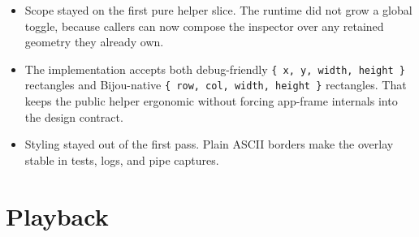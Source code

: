 \begin{itemize}
\tightlist
\item
  Scope stayed on the first pure helper slice. The runtime did not grow a global toggle, because callers can now compose the inspector over any retained geometry they already own.
\item
  The implementation accepts both debug-friendly \texttt{\{\allowbreak{} \allowbreak{}x\allowbreak{},\allowbreak{} \allowbreak{}y\allowbreak{},\allowbreak{} \allowbreak{}w\allowbreak{}i\allowbreak{}d\allowbreak{}t\allowbreak{}h\allowbreak{},\allowbreak{} \allowbreak{}h\allowbreak{}e\allowbreak{}i\allowbreak{}g\allowbreak{}h\allowbreak{}t\allowbreak{} \allowbreak{}\}} rectangles and Bijou-native \texttt{\{\allowbreak{} \allowbreak{}r\allowbreak{}o\allowbreak{}w\allowbreak{},\allowbreak{} \allowbreak{}c\allowbreak{}o\allowbreak{}l\allowbreak{},\allowbreak{} \allowbreak{}w\allowbreak{}i\allowbreak{}d\allowbreak{}t\allowbreak{}h\allowbreak{},\allowbreak{} \allowbreak{}h\allowbreak{}e\allowbreak{}i\allowbreak{}g\allowbreak{}h\allowbreak{}t\allowbreak{} \allowbreak{}\}} rectangles. That keeps the public helper ergonomic without forcing app-frame internals into the design contract.
\item
  Styling stayed out of the first pass. Plain ASCII borders make the overlay stable in tests, logs, and pipe captures.
\end{itemize}

\section{Playback}\label{record-122-playback}

